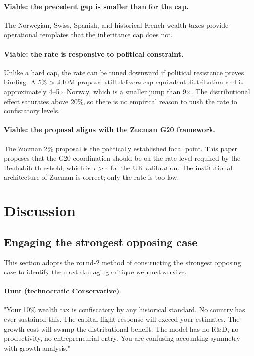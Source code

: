 \documentclass[11pt]{article}
\begin{document}
\paragraph{Viable: the precedent gap is smaller than for the cap.}
The Norwegian, Swiss, Spanish, and historical French wealth taxes
provide operational templates that the inheritance cap does not.

\paragraph{Viable: the rate is responsive to political constraint.}
Unlike a hard cap, the rate can be tuned downward if political
resistance proves binding.  A 5\% > \pounds 10M proposal still
delivers cap-equivalent distribution and is approximately
4--5$\times$ Norway, which is a smaller jump than 9$\times$.  The
distributional effect saturates above 20\%, so there is no
empirical reason to push the rate to confiscatory levels.

\paragraph{Viable: the proposal aligns with the Zucman G20
framework.}  The Zucman 2\% proposal is the politically established
focal point.  This paper proposes that the G20 coordination should
be on the rate level required by the Benhabib threshold, which is
$\tau > r$ for the UK calibration.  The institutional architecture
of Zucman is correct; only the rate is too low.

\section{Discussion}
\label{sec:discussion}

\subsection{Engaging the strongest opposing case}

This section adopts the round-2 method of constructing the
strongest opposing case to identify the most damaging critique we
must survive.

\paragraph{Hunt (technocratic Conservative).}  "Your 10\% wealth
tax is confiscatory by any historical standard.  No country has
ever sustained this.  The capital-flight response will exceed your
estimates.  The growth cost will swamp the distributional benefit.
The model has no R\&D, no productivity, no entrepreneurial entry.
You are confusing accounting symmetry with growth analysis."
\end{document}
